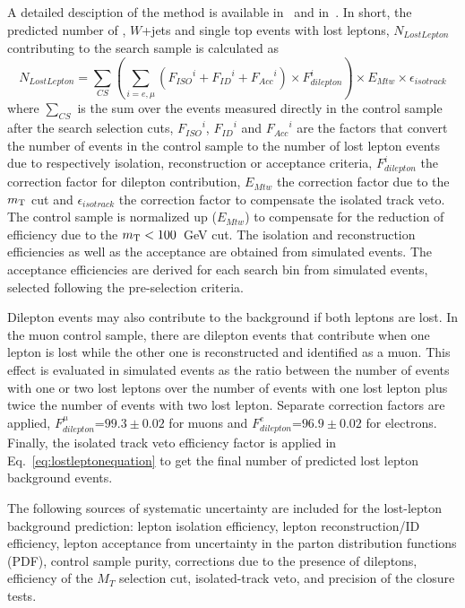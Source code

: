 A detailed desciption of the method is available in~\cite{LostLepton} and in~\cite{8TeVstopAN}. In short, the predicted number of \ttbar, $W$+jets and single top events with lost leptons, $N_{LostLepton}$ contributing to the search sample is calculated as
\begin{equation}
N_{LostLepton}= \sum_{CS} (\sum_{i={e,\mu}}({F_{ISO}}^{i}+{F_{ID}}^{i}+{F_{Acc}}^{i}) \times F_{dilepton}^{i}) \times E_{Mtw} \times \epsilon_{isotrack}
\label{eq:lostleptonequation}
\end{equation}
where $\sum_{CS}$ is the sum over the events measured directly in the control sample after the search selection cuts, ${F_{ISO}}^{i}$, ${F_{ID}}^{i}$ and ${F_{Acc}}^{i}$ are the factors that convert the number of events in the control sample to the number of lost lepton events due to respectively isolation, reconstruction or acceptance criteria, $F_{dilepton}^{i}$ the correction factor for dilepton contribution, $E_{Mtw}$ the correction factor due to the $m_{\rm T}$ cut and $\epsilon_{isotrack}$ the correction factor to compensate the isolated track veto. 
%
The control sample is normalized up ($E_{Mtw}$) to compensate for the reduction of efficiency due to the $m_{\rm T}<100$~GeV cut.
%
The isolation and reconstruction efficiencies as well as the acceptance are obtained from simulated \ttbar events.
%
The acceptance efficiencies are derived for each search bin from \ttbar simulated events, selected following the pre-selection criteria. 

Dilepton events may also contribute to the background if both leptons are lost.
%
In the muon control sample, there are dilepton events that contribute when one lepton is lost while the other one is reconstructed and identified as a muon.
%
This effect is evaluated in simulated \ttbar events as the ratio between the number of events with one or two lost leptons over the number of events with one lost lepton plus twice the number of events with two lost lepton. 
%
Separate correction factors are applied,  $F_{dilepton}^{\mu}$=$99.3\pm0.02$ for muons and $F_{dilepton}^{e}$=$96.9\pm0.02$ for electrons.
%
Finally, the isolated track veto efficiency factor is applied in Eq.~\ref{eq:lostleptonequation} to get the final number of predicted lost lepton background events. 

The following sources of systematic uncertainty are included for the lost-lepton background prediction: lepton isolation efficiency, lepton reconstruction/ID efficiency, lepton acceptance from uncertainty in the parton distribution functions (PDF), control sample purity, corrections due to the presence of dileptons, efficiency of the $M_T$ selection cut, isolated-track veto, and precision of the closure tests.

